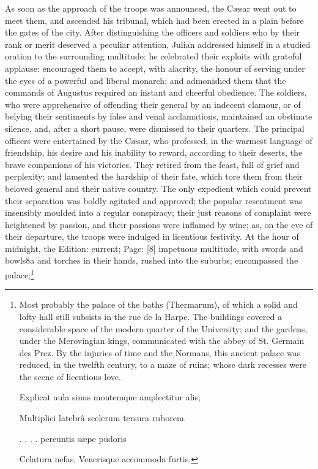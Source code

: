 As soon as the approach of the troops was announced, the Cæsar went out to meet them, and ascended his tribunal, which had been erected in a plain before the gates of the city. After distinguishing the officers and soldiers who by their rank or merit deserved a peculiar attention, Julian addressed himself in a studied oration to the surrounding multitude: he celebrated their exploits with grateful applause: encouraged them to accept, with alacrity, the honour of serving under the eyes of a powerful and liberal monarch; and admonished them that the commands of Augustus required an instant and cheerful obedience. The soldiers, who were apprehensive of offending their general by an indecent clamour, or of belying their sentiments by false and venal acclamations, maintained an obstinate silence, and, after a short pause, were dismissed to their quarters. The principal officers were entertained by the Cæsar, who professed, in the warmest language of friendship, his desire and his inability to reward, according to their deserts, the brave companions of his victories. They retired from the feast, full of grief and perplexity; and lamented the hardship of their fate, which tore them from their beloved general and their native country. The only expedient which could prevent their separation was boldly agitated and approved; the popular resentment was insensibly moulded into a regular conspiracy; their just reasons of complaint were heightened by passion, and their passions were inflamed by wine; as, on the eve of their departure, the troops were indulged in licentious festivity. At the hour of midnight, the Edition: current; Page: [8] impetuous multitude, with swords and bowls8a and torches in their hands, rushed into the suburbs; encompassed the palace;\footnote{Most probably the palace of the baths (Thermarum), of which a solid and lofty hall still subsists in the rue de la Harpe. The buildings covered a considerable space of the modern quarter of the University; and the gardens, under the Merovingian kings, communicated with the abbey of St. Germain des Prez. By the injuries of time and the Normans, this ancient palace was reduced, in the twelfth century, to a maze of ruins; whose dark recesses were the scene of licentious love.

Explicat aula sinus montemque amplectitur alis;

Multiplici latebrâ scelerum tersura ruborem.

. . . . pereuntis sæpe pudoris

Celatura nefas, Venerisque accommoda furtis.

}
